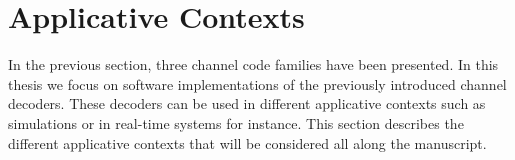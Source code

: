


\section{Applicative Contexts}

In the previous section, three channel code families have been presented. In
this thesis we focus on software implementations of the previously introduced
channel decoders. These decoders can be used in different applicative contexts
such as simulations or in real-time systems for instance. This section
describes the different applicative contexts that will be considered all along
the manuscript.

